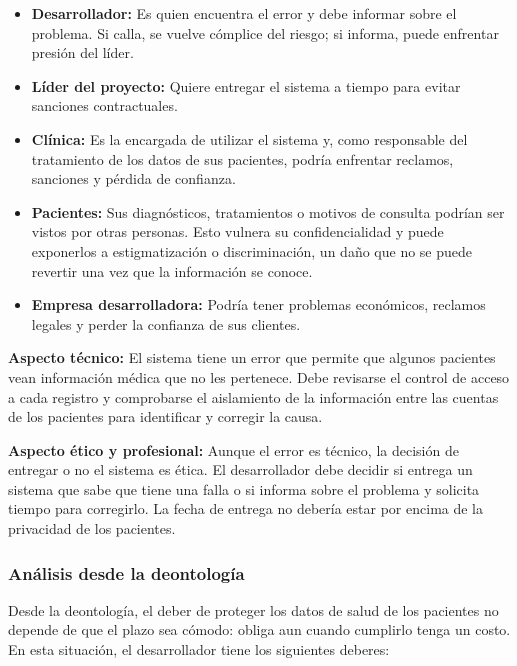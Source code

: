 \documentclass[12pt,a4paper,oneside]{article}
\begin{document}
\begin{itemize}[leftmargin=1.8em,itemsep=3pt]
    \item \textbf{Desarrollador:} Es quien encuentra el error y debe informar sobre el problema. Si calla, se vuelve cómplice del riesgo; si informa, puede enfrentar presión del líder.
    \item \textbf{Líder del proyecto:} Quiere entregar el sistema a tiempo para evitar sanciones contractuales.
    \item \textbf{Clínica:} Es la encargada de utilizar el sistema y, como responsable del tratamiento de los datos de sus pacientes, podría enfrentar reclamos, sanciones y pérdida de confianza.
    \item \textbf{Pacientes:} Sus diagnósticos, tratamientos o motivos de consulta podrían ser vistos por otras personas. Esto vulnera su confidencialidad y puede exponerlos a estigmatización o discriminación, un daño que no se puede revertir una vez que la información se conoce.
    \item \textbf{Empresa desarrolladora:} Podría tener problemas económicos, reclamos legales y perder la confianza de sus clientes.
\end{itemize}

\textbf{Aspecto técnico:} El sistema tiene un error que permite que algunos pacientes vean información médica que no les pertenece. Debe revisarse el control de acceso a cada registro y comprobarse el aislamiento de la información entre las cuentas de los pacientes para identificar y corregir la causa.

\textbf{Aspecto ético y profesional:} Aunque el error es técnico, la decisión de entregar o no el sistema es ética. El desarrollador debe decidir si entrega un sistema que sabe que tiene una falla o si informa sobre el problema y solicita tiempo para corregirlo. La fecha de entrega no debería estar por encima de la privacidad de los pacientes.

\subsubsection{Análisis desde la deontología}

Desde la deontología, el deber de proteger los datos de salud de los pacientes no depende de que el plazo sea cómodo: obliga aun cuando cumplirlo tenga un costo. En esta situación, el desarrollador tiene los siguientes deberes:
\end{document}
